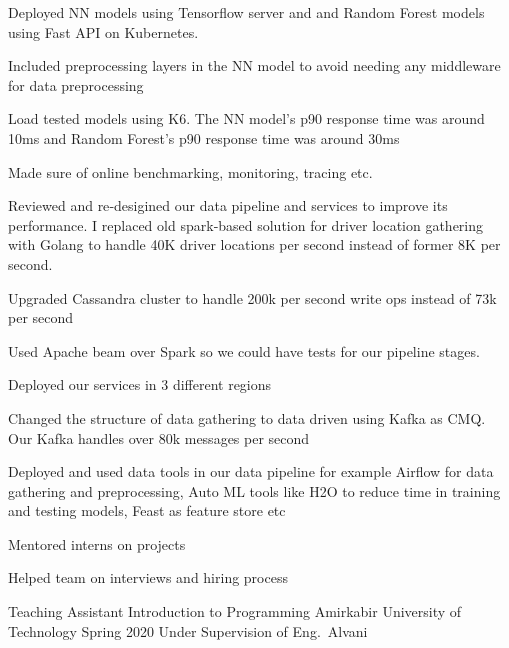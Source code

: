 \begin{cventries}
{\begin{cvitems}
        \item Deployed NN models using Tensorflow server and and Random Forest models using Fast API on Kubernetes. 
        \item Included preprocessing layers in the NN model to avoid needing any middleware for data preprocessing
        \item Load tested models using K6. The NN model's p90 response time was around 10ms and Random Forest's p90 response time was around 30ms
        \item Made sure of online benchmarking, monitoring, tracing etc.
        \item Reviewed and re‐desigined our data pipeline and services to improve its performance. I replaced old spark‐based solution for driver location gathering with Golang to handle 40K driver locations per second instead of former 8K per second.
        \item Upgraded Cassandra cluster to handle 200k per second write ops instead of 73k per second
        \item Used Apache beam over Spark so we could have tests for our pipeline stages.
        \item Deployed our services in 3 different regions 
        \item Changed the structure of data gathering to data driven using Kafka as CMQ. Our Kafka handles over 80k messages per second
        \item Deployed and used data tools in our data pipeline for example Airflow for data gathering and preprocessing, Auto ML tools like H2O to reduce time in training and testing models, Feast as feature store etc
        \item Mentored interns on projects
        \item Helped team on interviews and hiring process
      \end{cvitems}
    }

\end{cventries}


\begin{cventries}

  \cventry
    {Teaching Assistant} %
    {Introduction to Programming} %
    {Amirkabir University of Technology} %
    {Spring 2020} %
    {Under Supervision of Eng.~Alvani}


\end{cventries}
